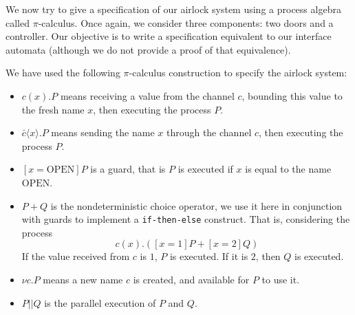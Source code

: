 \begin{example}
  \label{example:sota:airlockprocess}

  We now try to give a specification of our airlock system using a process
  algebra called \( \pi \)-calculus.
  Once again, we consider three components: two doors and a controller.
  Our objective is to write a specification equivalent to our interface automata
  (although we do not provide a proof of that equivalence).

  We have used the following \( \pi \)-calculus construction to specify the
  airlock system:
  \begin{itemize}
  \item \( c(x). P\) means receiving a value from the channel \( c \), bounding
    this value to the fresh name \( x \), then executing the process \( P \).
  \item \( \bar{c} \langle x \rangle . P \) means sending the
    name \( x \) through the channel \( c \), then executing the process
    \( P \).
  \item \( [x = \mathrm{OPEN}] P \) is a guard, that is \( P \) is executed if
    \( x \) is equal to the name \( \mathrm{OPEN} \).
  \item \( P + Q \) is the nondeterministic choice operator, we use it here in
    conjunction with guards to implement a \texttt{if-then-else} construct. That
    is, considering the process
    \[
      c(x) . ([x = 1] P + [x = 2] Q)
    \]
    If the value received from \( c \) is \( 1 \), \( P \) is executed.
    If it is \( 2 \), then \( Q \) is executed.
  \item \( \nu c. P \) means a new name \( c \) is created, and available for
    \( P \) to use it.
  \item \( P || Q \) is the parallel execution of \( P \) and \( Q \).
  \end{itemize}


\end{example}
